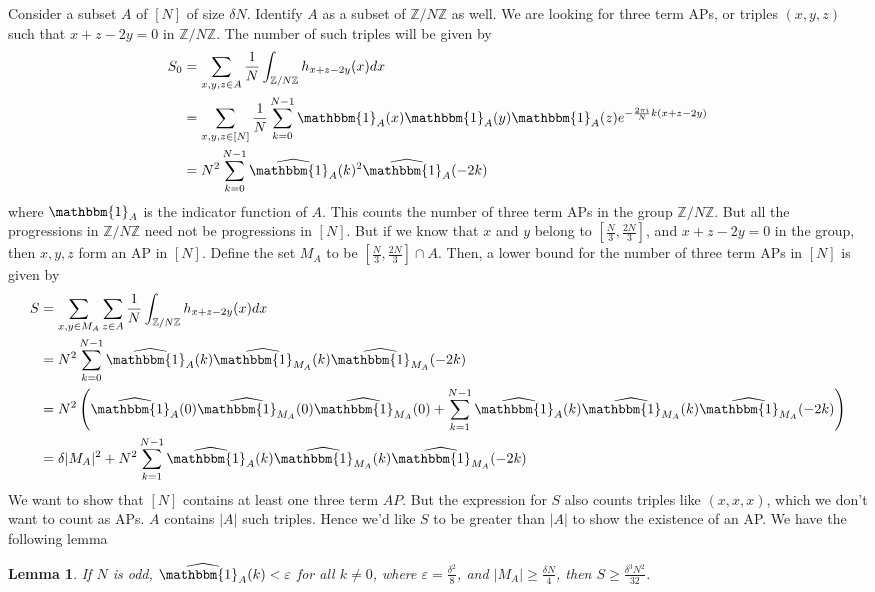 \documentclass[12pt, titlepage]{article}
\newtheorem{lem}[thm]{Lemma}
\theoremstyle{definition}
\newcommand{\vep}{\varepsilon}
\newcommand{\znz}{\mathbb{Z}/N\mathbb{Z}}
\newcommand{\indi}{\mathbbm{1}}
\begin{document}
Consider a subset $A$ of $[N]$ of size $\delta N$. Identify $A$ as a subset of $\znz$ as well. We are looking for three term APs, or triples $(x,y,z)$ such that $x+z - 2y = 0$ in $\znz$. The number of such triples will be given by
\begin{align*}
    S_0 &= \sum_{x,y,z \in A} \frac{1}{N} \int_{\znz} h_{x+z-2y}(x) dx \\
    &= \sum_{x,y,z \in [N]} \frac{1}{N} \sum_{k=0}^{N-1} \indi_{A}(x) \indi_{A}(y) \indi_{A}(z) e^{-\frac{2\pi i}{N} k (x+z-2y)} \\
    &= N^2 \sum_{k=0}^{N-1} \widehat{\indi_A}(k)^2 \widehat{\indi_A}(-2k)
\end{align*}
where $\indi_A$ is the indicator function of $A$. This counts the number of three term APs in the group $\znz$. But all the progressions in $\znz$ need not be progressions in $[N]$. But if we know that $x$ and $y$ belong to $\left[ \frac{N}{3}, \frac{2N}{3} \right]$, and $x+z-2y=0$ in the group, then $x,y,z$ form an AP in $[N]$. Define the set $M_A$ to be $\left[ \frac{N}{3}, \frac{2N}{3} \right] \cap A$. Then, a lower bound for the number of three term APs in $[N]$ is given by
\begin{align*}
    S &= \sum_{x,y \in M_A} \sum_{z \in A}  \frac{1}{N} \int_{\znz} h_{x+z-2y}(x) dx \\
    &= N^2 \sum_{k=0}^{N-1} \widehat{\indi_A}(k) \widehat{\indi_{M_A}}(k) \widehat{\indi_{M_A}}(-2k) \\
    &= N^2 \left(\widehat{\indi_A}(0) \widehat{\indi_{M_A}}(0) \widehat{\indi_{M_A}}(0) + \sum_{k=1}^{N-1} \widehat{\indi_A}(k) \widehat{\indi_{M_A}}(k) \widehat{\indi_{M_A}}(-2k) \right) \\
    &= \delta |M_A|^2 + N^2 \sum_{k=1}^{N-1} \widehat{\indi_A}(k) \widehat{\indi_{M_A}}(k) \widehat{\indi_{M_A}}(-2k)
\end{align*}
We want to show that $[N]$ contains at least one three term $AP$. But the expression for $S$ also counts triples like $(x,x,x)$, which we don't want to count as APs. $A$ contains $|A|$ such triples. Hence we'd like $S$ to be greater than $|A|$ to show the existence of an AP. We have the following lemma
\begin{lem}\label{lem:3}
    If $N$ is odd, $\widehat{\indi_A}(k) < \vep$ for all $k \neq 0$, where $\vep = \frac{\delta^2}{8}$, and $|M_A| \geq \frac{\delta N}{4}$, then $S \geq \frac{\delta^3 N^2}{32}$.
\end{lem}
\end{document}
